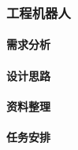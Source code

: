 \subsubsection{工程机器人}

    \paragraph{需求分析}
    
    \paragraph{设计思路}
    
    \paragraph{资料整理}
    
    \paragraph{任务安排}
    